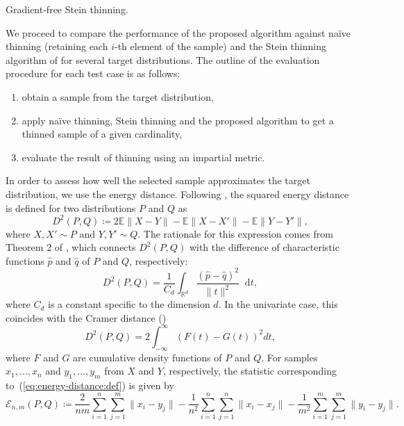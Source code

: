 \documentclass[11pt,a4paper]{report}
\newcommand*\diff{\mathop{}\!\mathrm{d}}
\DeclareMathOperator*{\argmin}{arg\,min}
\begin{document}
\begin{algorithm}[t]
\caption{Gradient-free Stein thinning.}\label{alg:gf}

\For{$j = 1, \dots, m$}{
$$\pi(j) \in \argmin_{i=1,\dots,n} \frac{k_{P,Q}(x_i, x_i)}{2} + \sum_{j'=1}^{j-1} k_{P,Q}(x_{\pi(j'}, x_i)$$
}
\end{algorithm}

We proceed to compare the performance of the proposed algorithm against na\"ive thinning (retaining each $i$-th element of the sample) and the Stein thinning algorithm of \cite{riabizOptimalThinningMCMC2022} for several target distributions. The outline of the evaluation procedure for each test case is as follows:
\begin{enumerate}
\item obtain a sample from the target distribution,
\item apply na\"ive thinning, Stein thinning and the proposed algorithm to get a thinned sample of a given cardinality,
\item evaluate the result of thinning using an impartial metric.
\end{enumerate}

In order to assess how well the selected sample approximates the target distribution, we use the energy distance. Following \cite{rizzoEnergyDistance2016}, the squared energy distance is defined for two distributions $P$ and $Q$ as
\begin{equation}
D^2(P, Q) \coloneq 2 \mathbb{E} \|X - Y\| - \mathbb{E}\|X - X'\| - \mathbb{E} \|Y - Y'\|,
\label{eq:energy-distance:def}
\end{equation}
where $X, X' \sim P$ and $Y, Y' \sim Q$. The rationale for this expression comes from Theorem 2 of \cite{szekelyEstatisticsEnergyStatistical2002}, which connects $D^2(P, Q)$ with the difference of characteristic functions $\hat{p}$ and $\hat{q}$ of $P$ and $Q$, respectively:
\begin{equation*}
D^2(P, Q) = \frac{1}{C_d} \int_{\mathbb{R}^d} \frac{(\hat{p} - \hat{q})^2}{\|t\|^2} \diff t,
\end{equation*}
where $C_d$ is a constant specific to the dimension $d$. In the univariate case, this coincides with the Cramer distance (\cite{cramerCompositionElementaryErrors1928})
\begin{equation*}
D^2(P, Q) = 2 \int_{-\infty}^{\infty} (F(t) - G(t))^2 dt,
\end{equation*}
where $F$ and $G$ are cumulative density functions of $P$ and $Q$.
For samples $x_1, \dots, x_n$ and $y_1, \dots, y_m$ from $X$ and $Y$, respectively, the statistic corresponding to~(\ref{eq:energy-distance:def}) is given by
\begin{equation*}
\mathcal{E}_{n,m}(P, Q) \coloneq \frac{2}{nm}\sum_{i=1}^n \sum_{j=1}^m \|x_i - y_j\| - \frac{1}{n^2} \sum_{i=1}^n\sum_{j=1}^n \|x_i - x_j\| - \frac{1}{m^2} \sum_{i=1}^m \sum_{j=1}^m \|y_i - y_j\|.
\label{eq:energy-distance:discrete}
\end{equation*}
\end{document}
